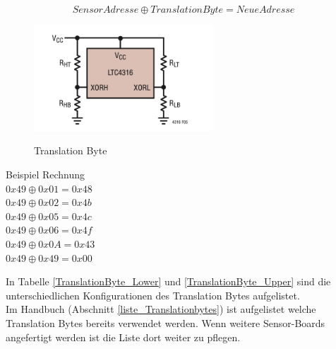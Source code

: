 \begin{equation} 
\label{I2C-translation}
Sensor Adresse\oplus TranslationByte = NeueAdresse
\end{equation}


\begin{figure}
\centering
\caption{Translation Byte}
\includegraphics[width=0.6\textwidth]{img/Translation-Byte}
\label{fig:Translation-Byte}
\end{figure}
\bigskip

Beispiel Rechnung\\
$0x49 \oplus 0x01 = 0x48$\\
$0x49 \oplus 0x02 = 0x4b$\\
$0x49 \oplus 0x05 = 0x4c$\\
$0x49 \oplus 0x06 = 0x4f$\\
$0x49 \oplus 0x0A = 0x43$\\
$0x49 \oplus 0x49 = 0x00$\\

\newpage

\noindent In Tabelle \ref{TranslationByte_Lower} und \ref{TranslationByte_Upper} sind die unterschiedlichen Konfigurationen des Translation Bytes aufgelistet.\\
Im Handbuch (Abschnitt \ref{liste_Translationbytes}) ist aufgelistet welche Translation Bytes bereits verwendet werden. Wenn weitere Sensor-Boards angefertigt werden ist die Liste dort weiter zu pflegen.

